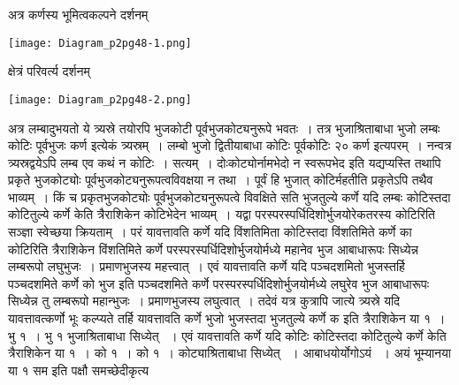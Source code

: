 \documentclass[11pt, openany]{book}
\begin{document}
\newpage

\begin{sloppypar}
अत्र कर्णस्य भूमित्वकल्पने दर्शनम्

\begin{center}
\texttt{[image: Diagram\_p2pg48-1.png]}
\end{center}

क्षेत्रं परिवर्त्य दर्शनम्

\begin{center}
\texttt{[image: Diagram\_p2pg48-2.png]}
\end{center}

अत्र लम्बादुभयतो ये त्र्यस्रे तयोरपि भुजकोटी पूर्वभुजकोट्यनुरूपे भवतः~। तत्र भुजाश्रिताबाधा भुजो लम्बः कोटिः पूर्वभुजः कर्ण इत्येकं त्र्यस्रम्~। लम्बो भुजो द्वितीयाबाधा कोटिः पूर्वकोटिः २० कर्ण इत्यपरम्~। नन्वत्र त्र्यस्रद्वयेऽपि लम्ब एव कथं न कोटिः~। सत्यम्~। दोःकोट्योर्नामभेदो न स्वरूपभेद इति यद्यप्यस्ति तथापि प्रकृते भुजकोट्योः पूर्वभुजकोट्यनुरूपत्वविवक्षया न तथा~। पूर्वं हि भुजात् कोटिर्महतीति प्रकृतेऽपि तथैव भाव्यम्~। किं च प्रकृतभुजकोट्योः पूर्वभुजकोट्यनुरूपत्वे विवक्षिते सति भुजतुल्ये कर्णे यदि लम्बः कोटिस्तदा कोटितुल्ये कर्णे केति त्रैराशिकेन कोटिभेदेन भाव्यम्~। यद्वा परस्परस्पर्धिदिशोर्भुजयोरेकतरस्य कोटिरिति सञ्ज्ञा स्वेच्छया क्रियताम्~। परं यावत्तावति कर्णे यदि विंशतिमिता कोटिस्तदा विंशतिमिते कर्णे का कोटिरिति त्रैराशिकेन विंशतिमिते कर्णे परस्परस्पर्धिदिशोर्भुजयोर्मध्ये महानेव भुज आबाधारूपः सिध्येन्न लम्बरूपो लघुभुजः~। प्रमाणभुजस्य महत्त्वात्~। एवं यावत्तावति कर्णे यदि पञ्चदशमितो भुजस्तर्हि पञ्चदशमिते कर्णे को भुज इति पञ्चदशमिते कर्णे परस्परस्पर्धिदिशोर्भुजयोर्मध्ये लघुरेव भुज आबाधारूपः सिध्येन्न तु लम्बरूपो महान्भुजः~। प्रमाणभुजस्य लघुत्वात्~। तदेवं यत्र कुत्रापि जात्ये त्र्यस्रे यदि यावत्तावत्कर्णो भूः कल्प्यते तर्हि यावत्तावति कर्णे भुजो भुजस्तदा भुजतुल्ये कर्णे क इति त्रैराशिकेन या १~। भु १~। भु १ भुजाश्रिताबाधा सिध्येत् ~। एवं यावत्तावति कर्णे यदि कोटिः कोटिस्तदा कोटितुल्ये कर्णे केति त्रैराशिकेन या १~। को १~। को १~। कोट्याश्रिताबाधा सिध्येत् ~। आबाधयोर्योगोऽयं ~। अयं भूम्यानया या १ सम इति पक्षौ समच्छेदीकृत्य

\end{sloppypar}
\end{document}
